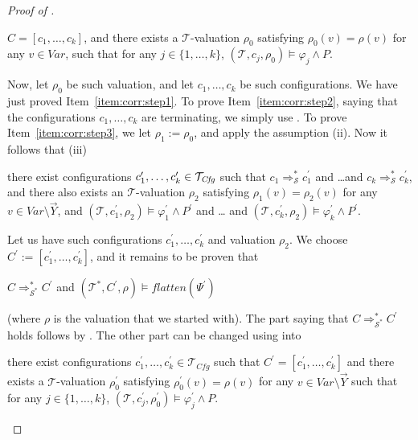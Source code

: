 \begin{proof}[Proof of ]
\begin{enumerate}
\begin{proofenv}
        $C = [c_1, \ldots, c_k ]$, and
        there exists a $\mathcal{T}$-valuation $\rho_0$ satisfying $\rho_0(v) = \rho(v)$
        for any $v \in \mathit{Var}$,
        such that for any $j \in \{ 1, \ldots, k \}$, $(\mathcal{T} , c_j , \rho_0 ) \vDash  \varphi_j \land P$.
    \end{proofenv}
    Now, let $\rho_0$ be such valuation,
    and let $c_1,\ldots,c_k$ be such configurations. We have just proved Item~\ref{item:corr:step1}.
    To prove Item~\ref{item:corr:step2}, saying that the configurations $c_1, \ldots, c_k$ are terminating,
    we simply use .
    To prove Item~\ref{item:corr:step3}, we let $\rho_1 := \rho_0$, and apply the assumption (ii).
    Now it follows that (iii)
    \begin{proofenv}
        there exist configurations $c_1^\prime,\ldots,c_k^\prime \in \mathcal{T}_{\mathit{Cfg}}$
        such that $c_1 \Rightarrow^{*}_{\mathcal{S}} c_1^\prime$
        and \ldots and $c_k \Rightarrow^{*}_{\mathcal{S}} c_k^\prime$,
        and there also exists an $\mathcal{T}$-valuation $\rho_2$
        satisfying $\rho_1(v) = \rho_2(v)$ for any $v \in \mathit{Var} \setminus \vec{Y}$,
        and
        $(\mathcal{T}, c_1^\prime,\rho_2) \vDash \varphi^\prime_1 \land P^\prime$ and \ldots
        and $(\mathcal{T}, c_k^\prime, \rho_2) \vDash \varphi^\prime_k \land P^\prime$.
    \end{proofenv}
    Let us have such configurations $c_1^\prime,\ldots,c_k^\prime$ and valuation $\rho_2$.
    We choose $C^\prime := [ c_1^\prime,\ldots,c_k^\prime ]$,
    and it remains to be proven that
    \begin{proofenv}
        $C \Rightarrow^*_{\mathcal{S}^*} C^\prime$ and $(\mathcal{T}^*, C^\prime, \rho) \vDash \mathit{flatten}(\Psi^\prime)$ \,
    \end{proofenv}
    (where $\rho$ is the valuation that we started with).
    The part saying that $C \Rightarrow^*_{\mathcal{S}^*} C^\prime$ holds
    follows by . The other part can be changed using  into
    \begin{proofenv}
        there exist configurations $c^\prime_1, \ldots, c^\prime_k \in \mathcal{T}_{\mathit{Cfg}}$ such that
        $C^\prime = [c^\prime_1, \ldots, c^\prime_k]$ and there exists a $\mathcal{T}$-valuation $\rho^\prime_0$
        satisfying $\rho^\prime_0(v) = \rho(v)$ for any $v \in \mathit{Var} \setminus \vec{Y}$
        such that for any $j \in \{ 1, \ldots, k \}$,
        $(\mathcal{T}, c^\prime_j, \rho^\prime_0) \vDash \varphi^\prime_j \land P$.

\end{proofenv}
\end{enumerate}
\end{proof}
